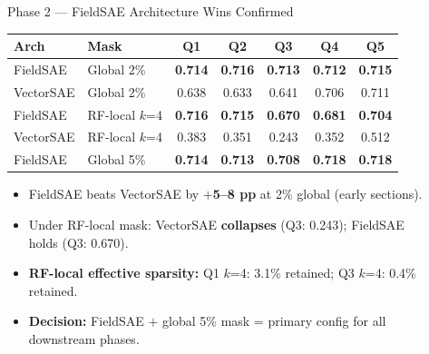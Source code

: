 \documentclass[final]{beamer}
\newlength{\sepwidth}
\newlength{\colwidth}
\newcommand{\separatorcolumn}{\begin{column}{\sepwidth}\end{column}}
\begin{document}
\begin{frame}[t]
\begin{columns}[t]
\begin{column}{\colwidth}
\begin{block}{Phase 2 --- FieldSAE Architecture Wins \textcolor{AccentGreen}{Confirmed}}
\small
\begin{center}
\begin{tabular}{@{}llccccc@{}}
\toprule
\textbf{Arch} & \textbf{Mask} & \textbf{Q1} & \textbf{Q2} & \textbf{Q3} & \textbf{Q4} & \textbf{Q5} \\
\midrule
\rowcolor{LightGreen}
FieldSAE & Global 2\% & \textbf{0.714} & \textbf{0.716} & \textbf{0.713} & \textbf{0.712} & \textbf{0.715} \\
VectorSAE & Global 2\% & 0.638 & 0.633 & 0.641 & 0.706 & 0.711 \\
\midrule
\rowcolor{LightGreen}
FieldSAE & RF-local $k$=4 & \textbf{0.716} & \textbf{0.715} & \textbf{0.670} & \textbf{0.681} & \textbf{0.704} \\
VectorSAE & RF-local $k$=4 & 0.383 & 0.351 & 0.243 & 0.352 & 0.512 \\
\midrule
\rowcolor{LightGreen}
FieldSAE & Global 5\% & \textbf{0.714} & \textbf{0.713} & \textbf{0.708} & \textbf{0.718} & \textbf{0.718} \\
\bottomrule
\end{tabular}
\end{center}

\begin{itemize}[leftmargin=1.5em, itemsep=1pt]
  \item FieldSAE beats VectorSAE by \textbf{$+$5--8 pp} at 2\% global (early sections).
  \item Under RF-local mask: VectorSAE \textbf{collapses} (Q3: 0.243); FieldSAE holds (Q3: 0.670).
  \item \textbf{RF-local effective sparsity:} Q1 $k$=4: 3.1\% retained; Q3 $k$=4: 0.4\% retained.
  \item \textbf{Decision:} FieldSAE $+$ global 5\% mask = primary config for all downstream phases.
\end{itemize}
\end{block}

\end{column}
\separatorcolumn

\begin{column}{\colwidth}


\end{column}
\end{columns}
\end{frame}
\end{document}
